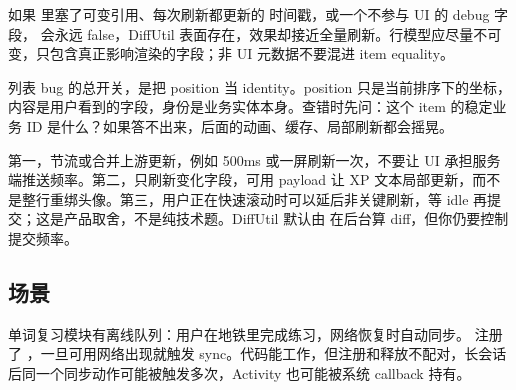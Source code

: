 \begin{pitfall}
如果  里塞了可变引用、每次刷新都更新的  时间戳，或一个不参与 UI 的 debug 字段， 会永远 false，DiffUtil 表面存在，效果却接近全量刷新。行模型应尽量不可变，只包含真正影响渲染的字段；非 UI 元数据不要混进 item equality。
\end{pitfall}

\begin{idea}[身份、内容、位置三件事要分开]
列表 bug 的总开关，是把 position 当 identity。position 只是当前排序下的坐标，内容是用户看到的字段，身份是业务实体本身。查错时先问：这个 item 的稳定业务 ID 是什么？如果答不出来，后面的动画、缓存、局部刷新都会摇晃。
\end{idea}

\begin{followup}[“如果排行榜是每秒都在变的实时数据呢？”]
第一，节流或合并上游更新，例如 500ms 或一屏刷新一次，不要让 UI 承担服务端推送频率。第二，只刷新变化字段，可用 payload 让 XP 文本局部更新，而不是整行重绑头像。第三，用户正在快速滚动时可以延后非关键刷新，等 idle 再提交；这是产品取舍，不是纯技术题。DiffUtil 默认由  在后台算 diff，但你仍要控制提交频率。
\end{followup}


\subsection*{场景}
单词复习模块有离线队列：用户在地铁里完成练习，网络恢复时自动同步。 注册了 ，一旦可用网络出现就触发 sync。代码能工作，但注册和释放不配对，长会话后同一个同步动作可能被触发多次，Activity 也可能被系统 callback 持有。

